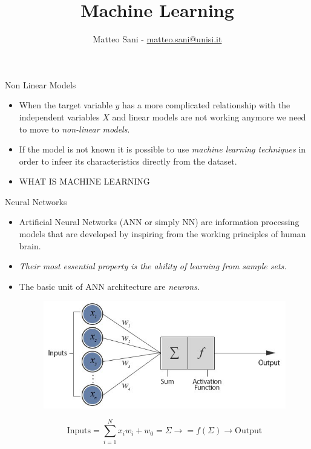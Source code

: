 \documentclass{beamer}
\title{Machine Learning}
\author{Matteo Sani - \href{mailto:matteo.sani@unisi.it}{matteo.sani@unisi.it}}
\begin{document}
\begin{frame}[plain]
	\maketitle
\end{frame}

\begin{frame}{Non Linear Models}
  \begin{itemize}
    \item When the target variable $y$ has a more complicated relationship with the independent variables $X$ and linear models are not working anymore we need to move to \emph{non-linear models}.
    \item If the model is not known it is possible to use \emph{machine learning techniques} in order to infeer its characteristics directly from the dataset.
    \item WHAT IS MACHINE LEARNING
  \end{itemize}
\end{frame}

\begin{frame}{Neural Networks}
  \begin{itemize}
  \item Artificial Neural Networks (ANN or simply NN) are information processing models that are developed by inspiring from the working principles of human brain.
  \item \emph{Their most essential property is the ability of learning from sample sets.}
  \item The basic unit of ANN architecture are \emph{neurons}. 
    \begin{figure}[htb]
      \begin{center}
        \includegraphics[width=0.55\linewidth]{neuron}
      \end{center}
    \end{figure}
    \begin{equation}  
      \textrm{Inputs} = \sum_{i=1}^{N} x_i w_i +w_0 = \Sigma \rightarrow = f(\Sigma) \rightarrow \textrm{Output}
    \end{equation}
  \end{itemize}
\end{frame}
\end{document}
